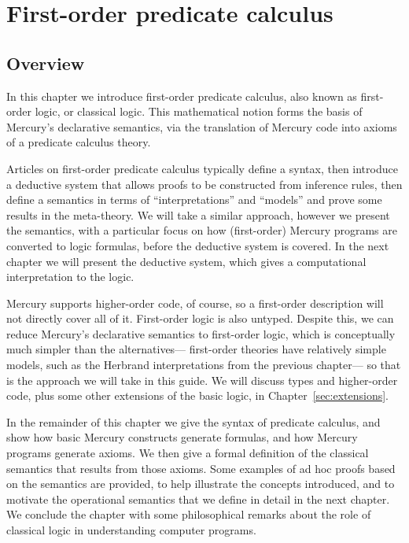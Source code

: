 \chapter{First-order predicate calculus}
\label{sec:fopc}

\section{Overview}

In this chapter we introduce first-order predicate calculus,
also known as first-order logic, or classical logic.
This mathematical notion
forms the basis of Mercury's declarative semantics,
via the translation of Mercury code
into axioms of a predicate calculus theory.

Articles on first-order predicate calculus
typically define a syntax,
then introduce a deductive system that allows proofs to be constructed
from inference rules,
then define a semantics in terms of ``interpretations'' and ``models''
and prove some results in the meta-theory.
We will take a similar approach,
however we present the semantics,
with a particular focus on how (first-order) Mercury programs
are converted to logic formulas,
before the deductive system is covered.
In the next chapter we will present the deductive system,
which gives a computational interpretation to the logic.

Mercury supports higher-order code, of course,
so a first-order description will not directly cover all of it.
First-order logic is also untyped.
Despite this,
we can reduce Mercury's declarative semantics to first-order logic,
which is conceptually much simpler than the alternatives---%
first-order theories have relatively simple models,
such as the Herbrand interpretations from the previous chapter---%
so that is the approach we will take in this guide.
We will discuss types and higher-order code,
plus some other extensions of the basic logic,
in Chapter~\ref{sec:extensions}.

In the remainder of this chapter
we give the syntax of predicate calculus,
and show how basic Mercury constructs generate formulas,
and how Mercury programs generate axioms.
We then give a formal definition of the classical semantics
that results from those axioms.
Some examples of ad hoc proofs based on the semantics are provided,
to help illustrate the concepts introduced,
and to motivate the operational semantics
that we define in detail in the next chapter.
We conclude the chapter with some philosophical remarks about
the role of classical logic in understanding computer programs.

